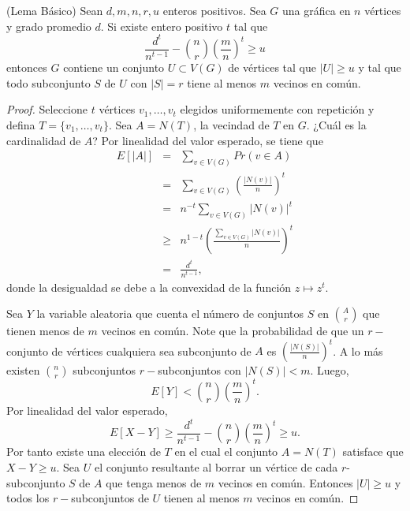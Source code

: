 \begin{theorem}(Lema Básico)\label{drc}
Sean $d, m, n, r, u$ enteros positivos. Sea $G$ una gráfica en
$n$ vértices y grado promedio $d$. Si existe
entero positivo $t$
tal que
$$\frac{d^t}{n^{t-1}} - \binom{n}{r} \left(\frac{m}{n}\right)^t \geq u$$
entonces $G$ contiene un conjunto $U \subset V(G)$ de vértices tal que
$\vert U \vert \geq u$ y tal que todo subconjunto $S$ de $U$ con
$\vert S \vert = r$
tiene al menos $m$ vecinos en común.
\end{theorem}
\begin{proof}
Seleccione $t$ vértices $v_1, \ldots, v_t$ elegidos uniformemente
con repetición y defina $T = \{v_1, \ldots, v_t\}$. Sea $A = N(T)$,
la vecindad de $T$ en $G$. ¿Cuál es la cardinalidad de $A$? Por
linealidad del valor esperado, se tiene que
\begin{eqnarray*}
  E[\vert A \vert] &=& \sum_{v \in V(G)} Pr(v \in A)\\
  &=& \sum_{v \in V(G)} \left(\frac{\vert N(v) \vert}{n} \right)^t\\
  &=& n^{-t} \sum_{v \in V(G)} \vert N(v) \vert^t \\
  &\ge& n^{1-t}\left( \frac{\sum_{v \in V(G)} \vert N(v) \vert}{n} \right)^t\\
  &=& \frac{d^t}{n^{t-1}},
\end{eqnarray*}
donde la desigualdad se debe a la convexidad de la función $z \mapsto z^t$.

Sea $Y$ la variable aleatoria que cuenta
el número de conjuntos $S$ en $\binom{A}{r}$ que tienen menos de
$m$ vecinos en común. Note que la probabilidad de que un
$r-$conjunto de vértices cualquiera sea subconjunto de $A$ es
$\left( \frac{\vert N(S) \vert}{n}\right)^t$. A lo más existen
$\binom{n}{r}$ subconjuntos $r-$subconjuntos con $\vert N(S)\vert < m$. Luego,
$$ E[Y] < \binom{n}{r}\left(\frac{m}{n}\right)^t. $$
Por linealidad del valor esperado,
$$E[X - Y] \geq \frac{d^t}{n^{t-1}} - \binom{n}{r}\left(\frac{m}{n}
\right)^t  \ge u.$$
Por tanto existe una elección de $T$ en el cual el conjunto $A =
N(T)$ satisface que $X - Y \ge u$.
Sea $U$ el conjunto resultante al borrar un vértice de cada
$r$-subconjunto $S$ de $A$ que tenga menos de $m$ vecinos en común.
Entonces $\vert U \vert \ge u$ y todos los $r-$subconjuntos de $U$
tienen al menos $m$ vecinos en común.
\end{proof}

